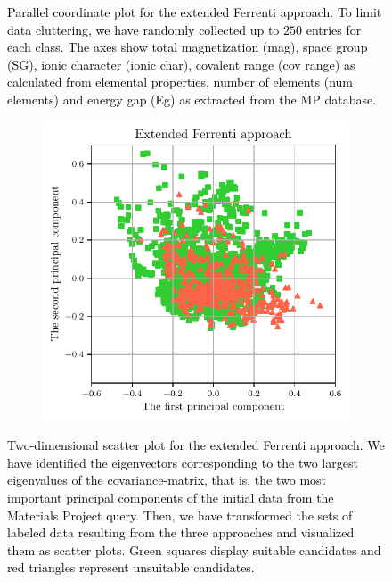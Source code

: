 \documentclass[superscriptaddress,unsortedaddress,
 amsmath,amssymb,
 aps,
]{revtex4-2}
\newcommand{\mrk}[1]{\textcolor{black}{#1}}
\begin{document}
\begin{figure}[t] %
    \centering
    \begin{subfigure}{1\textwidth}
        \centering
          \scalebox{0.85}{}
    \end{subfigure}
    \caption{\mrk{Parallel coordinate plot for the extended Ferrenti approach. To limit data cluttering, we have randomly collected up to $250$ entries for each class. The axes show total magnetization (mag), space group (SG), ionic character (ionic char), covalent range (cov range) as calculated from elemental properties, number of elements (num elements) and energy gap (Eg) as extracted from the MP database.}} 
    \label{fig:parallel-coordinates-approaches}
\end{figure}

\begin{figure}%
    \centering
    \begin{subfigure}{0.4\textwidth}
        \centering
        \includegraphics[width=1\textwidth]{AllFigures/02-augmented-ferrenti-approach.pdf}
    \end{subfigure}
    \caption{\mrk{Two-dimensional scatter plot for the extended Ferrenti approach. We have identified the eigenvectors corresponding to the two largest eigenvalues of the covariance-matrix, that is, the two most important principal components of the initial data from the Materials Project query. Then, we have transformed the sets of labeled data resulting from the three approaches and visualized them as scatter plots. Green squares display suitable candidates and red triangles represent unsuitable candidates.}}
    \label{fig:2dscatterplotpca}
\end{figure}
\end{document}
